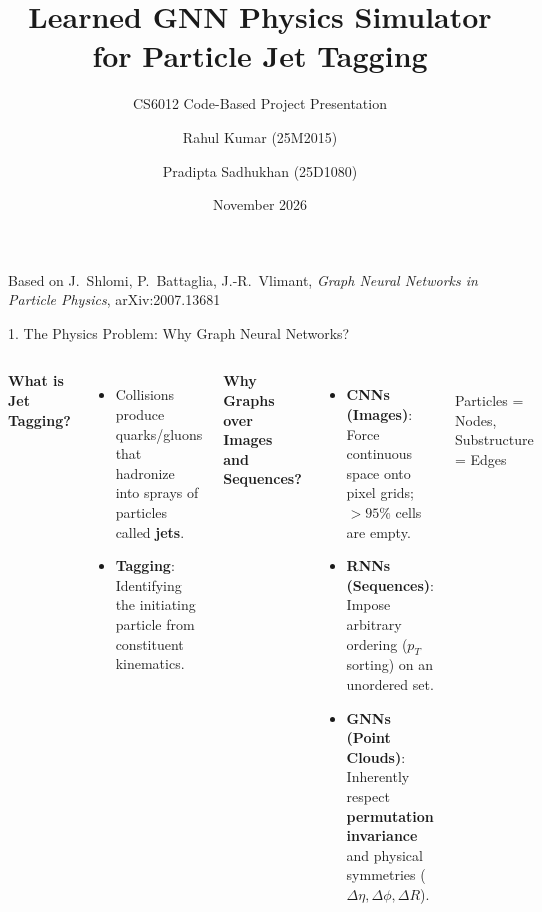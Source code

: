 \documentclass[aspectratio=169,11pt]{beamer}
\title[GNN Jet Tagging]{Learned GNN Physics Simulator for Particle Jet Tagging}
\subtitle{CS6012 Code-Based Project Presentation}
\author[Group 11]{Rahul Kumar (25M2015) \and Pradipta Sadhukhan (25D1080)}
\institute[IIT Bombay]{Dept.\ of SYSCON \& Dept.\ of Physics, IIT Bombay \\ \small Supervisor: Prof.\ Sharat Chandran}
\date{November 2026}
\begin{document}
\begin{frame}[plain]
  \titlepage
  \begin{center}
    \scriptsize Based on J.\ Shlomi, P.\ Battaglia, J.-R.\ Vlimant, \emph{Graph Neural Networks in Particle Physics}, arXiv:2007.13681
  \end{center}
\end{frame}

\begin{frame}{1. The Physics Problem: Why Graph Neural Networks?}
  \begin{columns}[T]
      \textbf{What is Jet Tagging?}
      \begin{itemize}\small
        \item Collisions produce quarks/gluons that hadronize into sprays of particles called \textbf{jets}.
        \item \textbf{Tagging}: Identifying the initiating particle from constituent kinematics.
      \end{itemize}

      \vspace{4pt}
      \textbf{Why Graphs over Images and Sequences?}
      \begin{itemize}\small
        \item \textbf{CNNs (Images)}: Force continuous space onto pixel grids; $>95\%$ cells are empty.
        \item \textbf{RNNs (Sequences)}: Impose arbitrary ordering ($p_T$ sorting) on an unordered set.
        \item \textbf{GNNs (Point Clouds)}: Inherently respect \textbf{permutation invariance} and physical symmetries ($\Delta \eta, \Delta \phi, \Delta R$).
      \end{itemize}

      \centering
      \\[4pt]
      {\scriptsize Particles = Nodes, Substructure = Edges}
  \end{columns}
\end{frame}
\end{document}
